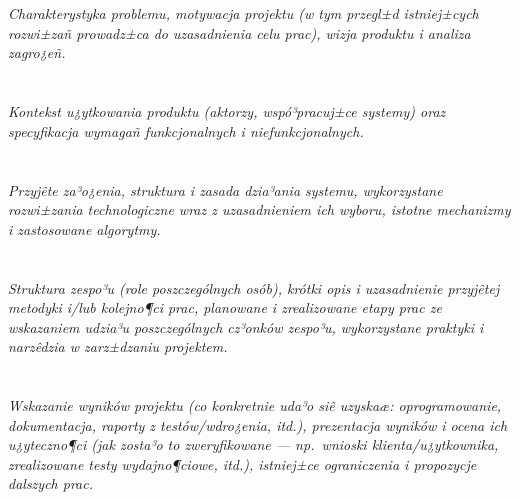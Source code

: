 \documentclass[polish,12pt]{aghthesis}
\author{Jan Kowalski, Jan Malinowski\\ Wojciech Kowalski}
\date{\the\year}
\begin{document}
\maketitle

\section{\SectionTitleProjectVision}
\label{sec:cel-wizja}
\emph{Charakterystyka problemu, motywacja projektu (w tym przegl±d
  istniej±cych rozwi±zañ prowadz±ca do uzasadnienia celu prac),
  wizja produktu i analiza zagro¿eñ.}  %

\section{\SectionTitleScope}
\label{sec:zakres-funkcjonalnosci}
\emph{Kontekst u¿ytkowania produktu (aktorzy, wspó³pracuj±ce systemy)
  oraz specyfikacja wymagañ funkcjonalnych i niefunkcjonalnych.}  %

\section{\SectionTitleRealizationAspects}
\label{sec:wybrane-aspekty-realizacji}
\emph{Przyjête za³o¿enia, struktura i zasada dzia³ania systemu,
  wykorzystane rozwi±zania technologiczne wraz z uzasadnieniem
  ich wyboru, istotne mechanizmy i zastosowane algorytmy.} %

\section{\SectionTitleWorkOrganization}
\label{sec:organizacja-pracy}
\emph{Struktura zespo³u (role poszczególnych osób), krótki opis i
  uzasadnienie przyjêtej metodyki i/lub kolejno¶ci prac, planowane i
  zrealizowane etapy prac ze wskazaniem udzia³u poszczególnych
  cz³onków zespo³u, wykorzystane praktyki i narzêdzia w zarz±dzaniu
  projektem.}  %

\section{\SectionTitleResults}
\label{sec:wyniki-projektu}
\emph{Wskazanie wyników projektu (co konkretnie uda³o siê uzyskaæ:
  oprogramowanie, dokumentacja, raporty z testów/wdro¿enia, itd.), prezentacja wyników
  i ocena ich u¿yteczno¶ci (jak zosta³o to zweryfikowane --- np.\ wnioski
  klienta/u¿ytkownika, zrealizowane testy wydajno¶ciowe, itd.),
  istniej±ce ograniczenia i propozycje dalszych prac.}  %


\nocite{artykul2011,ksiazka2011,narzedzie2011,projekt2011}


\end{document}
